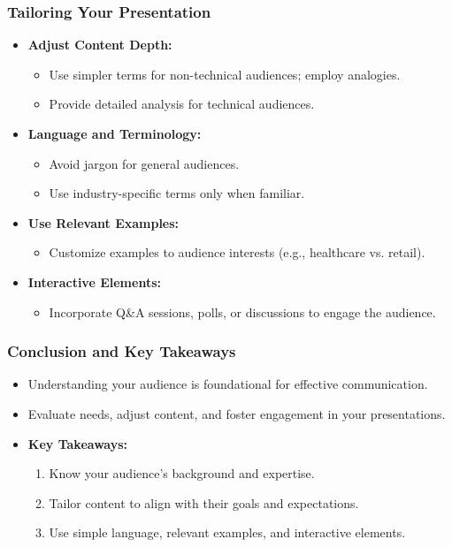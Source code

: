 \documentclass{beamer}
\begin{document}
\begin{frame}[fragile]
    \frametitle{Tailoring Your Presentation}
    \begin{itemize}
        \item \textbf{Adjust Content Depth:} 
        \begin{itemize}
            \item Use simpler terms for non-technical audiences; employ analogies.
            \item Provide detailed analysis for technical audiences.
        \end{itemize}
        
        \item \textbf{Language and Terminology:} 
        \begin{itemize}
            \item Avoid jargon for general audiences.
            \item Use industry-specific terms only when familiar.
        \end{itemize}
        
        \item \textbf{Use Relevant Examples:} 
        \begin{itemize}
            \item Customize examples to audience interests (e.g., healthcare vs. retail).
        \end{itemize}
        
        \item \textbf{Interactive Elements:} 
        \begin{itemize}
            \item Incorporate Q\&A sessions, polls, or discussions to engage the audience.
        \end{itemize}
    \end{itemize}
\end{frame}

\begin{frame}[fragile]
    \frametitle{Conclusion and Key Takeaways}
    \begin{itemize}
        \item Understanding your audience is foundational for effective communication.
        \item Evaluate needs, adjust content, and foster engagement in your presentations.
        \item \textbf{Key Takeaways:}
        \begin{enumerate}
            \item Know your audience's background and expertise.
            \item Tailor content to align with their goals and expectations.
            \item Use simple language, relevant examples, and interactive elements.
        \end{enumerate}
    \end{itemize}
\end{frame}
\end{document}

